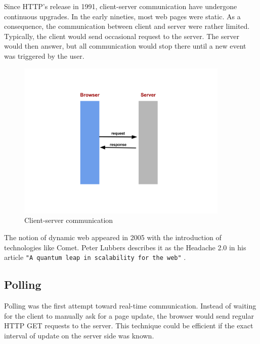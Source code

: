 Since HTTP's release in 1991, client-server communication have undergone
continuous upgrades. In the early nineties, most web pages were static. As a
consequence, the communication between client and server  were rather limited.
Typically, the client would send occasional request to the server. The server
would then answer, but all communication would stop there until a new event was
triggered by the user. 


\begin{figure}[H]
\centering
\includegraphics[width=0.9\textwidth]{./Figures/client_server_communication.png}
\caption[Client-server communication]{Client-server communication}
\label{fig:client_server_communication}
\end{figure}

The notion of dynamic web appeared in 2005 with the introduction of technologies
like Comet. Peter Lubbers describes it as the Headache 2.0 in his article
\texttt{"A quantum leap in scalability for the web"} \citep{Reference32}.

\subsection{Polling}

Polling was the first attempt toward real-time communication. Instead of waiting
for the client to manually ask for a page update, the browser would send regular
HTTP GET requests to the server. This technique could be efficient if the exact
interval of update on the server side was known.

